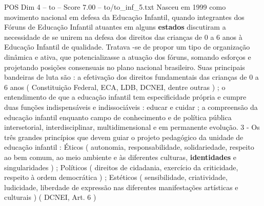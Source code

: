 \begin{textsample}{POS Dim 4 – to – Score 7.00 – to/to\_inf\_5.txt}
Nasceu em 1999 como movimento nacional em defesa da Educação Infantil, quando integrantes dos Fóruns de Educação Infantil atuantes em alguns \textbf{estados} discutiram a necessidade de se unirem na defesa dos direitos das crianças de 0 a 6 anos à Educação Infantil de qualidade.
Tratava -se de propor um tipo de organização dinâmica e ativa, que potencializasse a atuação dos fóruns, somando esforços e projetando posições consensuais no plano nacional brasileiro.
Suas principais bandeiras de luta são : a efetivação dos direitos fundamentais das crianças de 0 a 6 anos ( Constituição Federal, ECA, LDB, DCNEI, dentre outras ) ; o entendimento de que a educação infantil tem especificidade própria e cumpre duas funções indispensáveis e indissociáveis : educar e cuidar ; a compreensão da educação infantil enquanto campo de conhecimento e de política pública intersetorial, interdisciplinar, multidimensional e em permanente evolução. 3 - Os três grandes princípios que devem guiar o projeto pedagógico da unidade de educação infantil : Éticos ( autonomia, responsabilidade, solidariedade, respeito ao bem comum, ao meio ambiente e às diferentes culturas, \textbf{identidades} e singularidades ) ; Políticos ( direitos de cidadania, exercício da criticidade, respeito à ordem democrática ) ; Estéticos ( sensibilidade, criatividade, ludicidade, liberdade de expressão nas diferentes manifestações artísticas e culturais ) ( DCNEI, Art. 6 )

\end{textsample}
